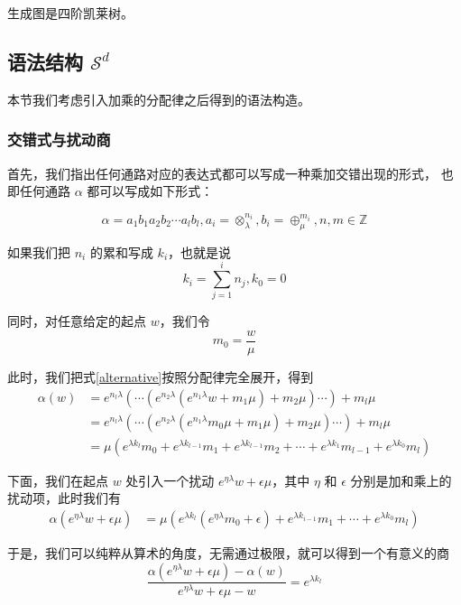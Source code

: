 \documentclass[a4paper,12pt]{article}
\numberwithin{definition}{section}
\numberwithin{lemma}{section}
\numberwithin{proposition}{section}
\numberwithin{theorem}{section}
\numberwithin{grammar}{section}
\numberwithin{program}{section}
\numberwithin{convention}{section}
\numberwithin{corollary}{section}
\begin{document}
生成图是四阶凯莱树。

\subsection{语法结构 $\mathcal{S}^d$}\label{subsec:syntactical2}

本节我们考虑引入加乘的分配律之后得到的语法构造。

\subsubsection{交错式与扰动商}

首先，我们指出任何通路对应的表达式都可以写成一种乘加交错出现的形式，
也即任何通路 $\alpha$ 都可以写成如下形式：

\begin{equation}
    \alpha = a_1 b_1 a_2 b_2 \cdots a_l b_l, a_i = \otimes_\lambda^{n_i}, b_i = \oplus_\mu^{m_i},  n, m \in \mathbb{Z}
    \label{alternative}
\end{equation}

如果我们把 $n_i$ 的累和写成 $k_i$，也就是说
$$
k_i = \sum_{j=1}^i n_j, k_0 = 0
$$

同时，对任意给定的起点 $w$，我们令
$$
m_0 = \frac{w}{\mu}
$$

此时，我们把式\ref{alternative}按照分配律完全展开，得到
\begin{align}
\alpha(w) & = e^{n_l \lambda}(\cdots (e^{n_2 \lambda} (e^{n_1 \lambda} w + m_1 \mu) + m_2 \mu) \cdots) + m_l \mu \\
& = e^{n_l \lambda}(\cdots (e^{n_2 \lambda} (e^{n_1 \lambda} m_0 \mu + m_1 \mu) + m_2 \mu) \cdots) + m_l \mu \\
& = \mu (e^{\lambda k_l} m_0 + e^{\lambda k_{l - 1}} m_1  + e^{\lambda k_{l - 1}} m_2 + \cdots + e^{\lambda k_1} m_{l-1} + e^{\lambda k_0} m_l)
\end{align}

下面，我们在起点 $w$ 处引入一个扰动 $e^{\eta \lambda} w + \epsilon \mu$，其中 $\eta$ 和 $\epsilon$ 分别是加和乘上的扰动项，此时我们有
\begin{align}
\alpha(e^{\eta \lambda} w + \epsilon \mu) & = \mu (e^{\lambda k_l} (e^{\eta \lambda} m_0 + \epsilon) + e^{\lambda k_{i - 1}} m_1 + \cdots + e^{\lambda k_0} m_l)
\end{align}

于是，我们可以纯粹从算术的角度，无需通过极限，就可以得到一个有意义的商
$$
\frac{\alpha(e^{\eta \lambda} w + \epsilon \mu) - \alpha(w)}{e^{\eta \lambda} w + \epsilon \mu - w} = e^{\lambda k_l}
$$
\end{document}
